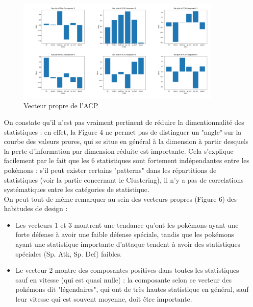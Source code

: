 \documentclass[a4paper,12pt]{article}
\begin{document}
\begin{figure}[htbp]
    \vspace{0.5cm}
    
    \includegraphics[width=0.9\textwidth]{Image/eigen_vector_PCA.png}
    \caption{Vecteur propre de l'ACP}
\end{figure}

On constate qu'il n'est pas vraiment pertinent de réduire la dimentionnalité des
statistiques : en effet, la Figure 4 ne permet pas de distinguer un "angle" sur
la courbe des valeurs prores, qui se situe en général à la dimension à partir
desquels la perte d'information par dimension réduite est importante. Cela
s'explique facilement par le fait que les 6 statistiques sont fortement
indépendantes entre les pokémons : s'il peut exister certains "patterns" dans
les répartitions de statistiques (voir la partie concernant le Clustering), il
n'y a pas de correlations systématiques entre les catégories de statistique. \\
On peut tout de même remarquer au sein des vecteurs propres (Figure 6) des
habitudes de design :
\begin{itemize}
    \item Les vecteurs 1 et 3 montrent une tendance qu'ont les pokémons ayant
    une forte défense à avoir une faible défense spéciale, tandis que les
    pokémons ayant une statistique importante d'attaque tendent à avoir des
    statistiques spéciales (Sp. Atk, Sp. Def) faibles.
    \item Le vecteur 2 montre des composantes positives dans toutes les
    statistiques sauf en vitesse (qui est quasi nulle) : la composante selon ce
    vecteur des pokémons dit "légendaires", qui ont de très hautes statistique
    en général, sauf leur vitesse qui est souvent moyenne, doit être importante.
\end{itemize}
\end{document}
